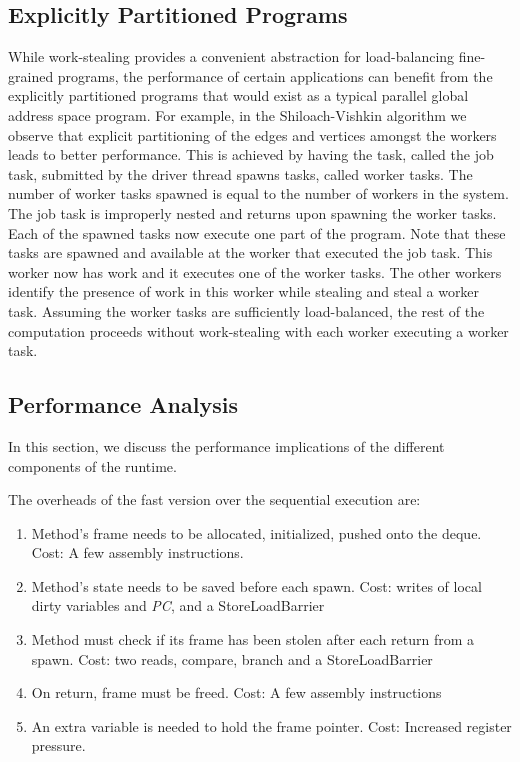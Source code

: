 \subsection{Explicitly Partitioned Programs}

While work-stealing provides a convenient abstraction for
load-balancing fine-grained programs, the performance of certain
applications can benefit from the explicitly partitioned programs that
would exist as a typical parallel global address space program. For
example, in the Shiloach-Vishkin algorithm we observe that explicit
partitioning of the edges and vertices amongst the workers leads to
better performance. This is achieved by having the task, called the
job task, submitted by the driver thread spawns tasks, called worker
tasks. The number of worker tasks spawned is equal to the number of
workers in the system. The job task is improperly nested and returns
upon spawning the worker tasks. Each of the spawned tasks now execute
one part of the program. Note that these tasks are spawned and
available at the worker that executed the job task. This worker now
has work and it executes one of the worker tasks. The other workers
identify the presence of work in this worker while stealing and steal
a worker task. Assuming the worker tasks are sufficiently
load-balanced, the rest of the computation proceeds without
work-stealing with each worker executing a worker task. 



\subsection{Performance Analysis}

In this section, we discuss the performance implications of the
different components of the runtime. 

The overheads of the fast version over the sequential execution are:

\begin{enumerate}
\item Method's frame needs to be allocated, initialized, pushed onto
  the deque. Cost: A few assembly instructions.
\item Method's state needs to be saved before each spawn. Cost: writes
  of local dirty variables and {\em PC}, and a {\java
  StoreLoadBarrier}
\item Method must check if its frame has been stolen after each
  return from a spawn. Cost: two reads, compare, branch and a 
  {\java StoreLoadBarrier} 
\item On return, frame must be freed. Cost: A few assembly instructions
\item An extra variable is needed to hold the frame pointer. Cost: Increased
  register pressure.
\end{enumerate}

